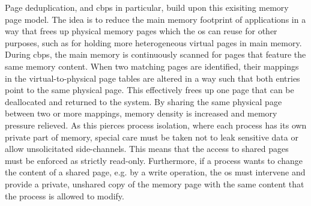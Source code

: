 Page deduplication, and \ac{cbps} in particular, build upon this exisiting memory page model.
The idea is to reduce the main memory footprint of applications in a way that frees up physical memory pages which the \ac{os} can reuse for other purposes, such as for holding more heterogeneous virtual pages in main memory.
During \ac{cbps}, the main memory is continuously scanned for pages that feature the same memory content.
When two matching pages are identified, their mappings in the virtual-to-physical page tables are altered in a way such that both entries point to the same physical page.
This effectively frees up one page that can be deallocated and returned to the system.
By sharing the same physical page between two or more mappings, memory density is increased and memory pressure relieved.
As this pierces process isolation, where each process has its own private part of memory, special care must be taken not to leak sensitive data or allow unsolicitated side-channels.
This means that the access to shared pages must be enforced as strictly read-only.
Furthermore, if a process wants to change the content of a shared page, e.g. by a write operation, the \ac{os} must intervene and provide a private, unshared copy of the memory page with the same content that the process is allowed to modify.
